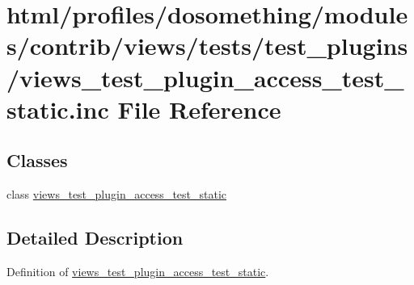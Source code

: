 \hypertarget{views__test__plugin__access__test__static_8inc}{
\section{html/profiles/dosomething/modules/contrib/views/tests/test\_\-plugins/views\_\-test\_\-plugin\_\-access\_\-test\_\-static.inc File Reference}
\label{views__test__plugin__access__test__static_8inc}
}
\subsection*{Classes}
\begin{DoxyCompactItemize}
\item 
class \hyperlink{classviews__test__plugin__access__test__static}{views\_\-test\_\-plugin\_\-access\_\-test\_\-static}
\end{DoxyCompactItemize}


\subsection{Detailed Description}
Definition of \hyperlink{classviews__test__plugin__access__test__static}{views\_\-test\_\-plugin\_\-access\_\-test\_\-static}. 